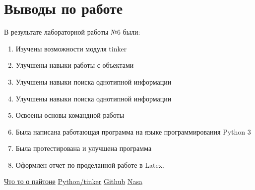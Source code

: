 \documentclass[a4paper,14pt]{extarticle}
\begin{document}
\newpage\section*{Выводы по работе}
В результате лабораторной работы №6 были: 
\begin{enumerate}
 \item Изучены возможности модуля tinker
 \item Улучшены навыки работы с объектами
 \item Улучшены навыки поиска однотипной информации
  \item Улучшены навыки поиска однотипной информации
 \item Освоены основы командной работы
 \item Была написана работающая программа на языке программирования Python 3
 \item Была протестирована и улучшена программа
  \item Оформлен отчет по проделанной работе в Latex.
\end{enumerate}

\newpage{}
\renewcommand\bibname{Список литературы}
\begin{thebibliography}{99}
 \href{https://habr.com/ru/post/31180/}{Что то о пайтоне}
 \href{https://python-scripts.com/tkinter-introduction}{Python/tinker}
 \href{https://github.com/features}{Github}
 \href{https://vk.com/away.php?to=https%3A%2F%2Fsolarsystem.nasa.gov%2Fplanets%2Foverview%2F&cc_key=}{Nasa}
\end{thebibliography}
\end{document}
